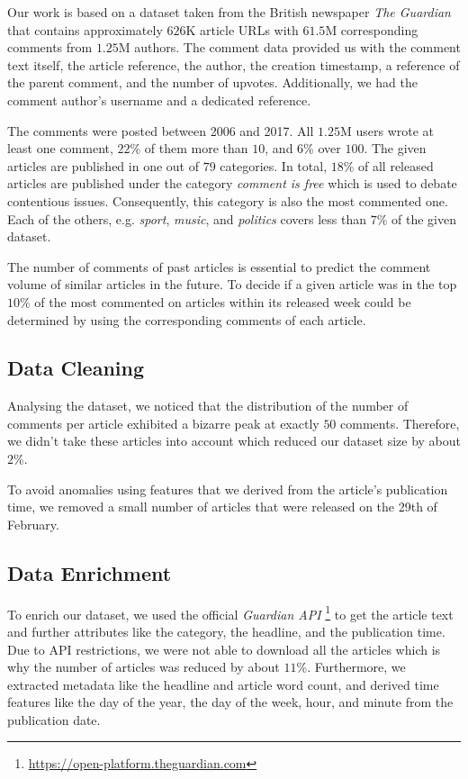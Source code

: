 Our work is based on a dataset taken from the British newspaper \textit{The Guardian} that contains approximately $626$K article URLs with $61.5$M corresponding comments from $1.25$M authors.
The comment data provided us with the comment text itself, the article reference, the author, the creation timestamp, a reference of the parent comment, and the number of upvotes. Additionally, we had the comment author's username and a dedicated reference.

The comments were posted between 2006 and 2017. All $1.25$M users wrote at least one comment, $22$\% of them more than $10$, and $6$\% over $100$.
The given articles are published in one out of $79$ categories. In total, $18$\% of all released articles are published under the category \textit{comment is free} which is used to debate contentious issues. Consequently, this category is also the most commented one. 
Each of the others, e.g. \textit{sport}, \textit{music}, and \textit{politics} covers less than $7$\% of the given dataset.

The number of comments of past articles is essential to predict the comment volume of similar articles in the future. 
To decide if a given article was in the top $10$\% of the most commented on articles within its released week could be determined by using the corresponding comments of each article.

\subsection{Data Cleaning}
Analysing the dataset, we noticed that the distribution of the number of comments per article exhibited a bizarre peak at exactly $50$ comments. Therefore, we didn't take these articles into account which reduced our dataset size by about $2$\%.

To avoid anomalies using features that we derived from the article's publication time, we removed a small number of articles that were released on the 29th of February.

\subsection{Data Enrichment}
To enrich our dataset, we used the official \textit{Guardian API} \footnote{\url{https://open-platform.theguardian.com}} to get the article text and further attributes like the category, the headline, and the publication time.
Due to API restrictions, we were not able to download all the articles which is why the number of articles was reduced by about $11$\%.
Furthermore, we extracted metadata like the headline and article word count, and derived time features like the day of the year, the day of the week, hour, and minute from the publication date.

